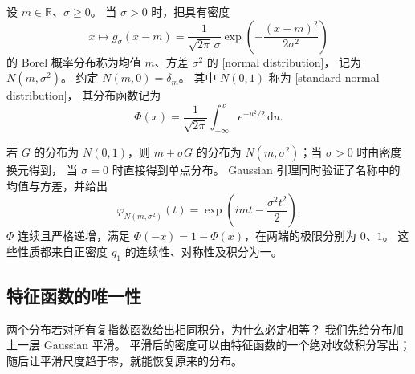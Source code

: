 \begin{definition}\label{b1:def:30-normal-distribution}
设 \(m\in\mathbb R\)、\(\sigma\geq0\)。
当 \(\sigma>0\) 时，把具有密度
\[
 x\longmapsto g_\sigma(x-m)
 =\frac{1}{\sqrt{2\pi}\,\sigma}
       \exp\left(-\frac{(x-m)^2}{2\sigma^2}\right)
\]
的 Borel 概率分布称为均值 \(m\)、方差 \(\sigma^2\) 的
[normal distribution]，
记为 \(N(m,\sigma^2)\)。
约定 \(N(m,0)=\delta_m\)。
其中 \(N(0,1)\) 称为
[standard normal distribution]，
其分布函数记为
\[
 \Phi(x)=\frac{1}{\sqrt{2\pi}}\int_{-\infty}^x e^{-u^2/2}\,\mathrm du.
\]
\end{definition}

若 \(G\) 的分布为 \(N(0,1)\)，则 \(m+\sigma G\) 的分布为
\(N(m,\sigma^2)\)；当 \(\sigma>0\) 时由密度换元得到，
当 \(\sigma=0\) 时直接得到单点分布。
Gaussian 引理同时验证了名称中的均值与方差，并给出
\begin{equation}\label{b1:eq:30-normal-characteristic}
 \varphi_{N(m,\sigma^2)}(t)
 =\exp\left(imt-\frac{\sigma^2t^2}{2}\right).
\end{equation}
\(\Phi\) 连续且严格递增，满足
\(\Phi(-x)=1-\Phi(x)\)，在两端的极限分别为 \(0\)、\(1\)。
这些性质都来自正密度 \(g_1\) 的连续性、对称性及积分为一。

\subsection{特征函数的唯一性}
\label{b1:subsec:300602}

两个分布若对所有复指数函数给出相同积分，为什么必定相等？
我们先给分布加上一层 Gaussian 平滑。
平滑后的密度可以由特征函数的一个绝对收敛积分写出；
随后让平滑尺度趋于零，就能恢复原来的分布。

